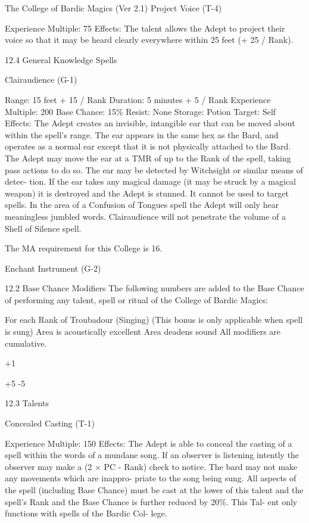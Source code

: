 \begin{Chapter}{The College of Bardic Magics (Ver 2.1)}
Project Voice (T-4) 

Experience Multiple: 75 
Effects: The talent allows the Adept to project their 
voice  so  that  it  may  be  heard  clearly  everywhere 
within 25 feet (+ 25 / Rank). 

12.4 General Knowledge Spells 

Clairaudience (G-1) 

Range: 15 feet + 15 / Rank 
Duration: 5 minutes + 5 / Rank 
Experience Multiple: 200 
Base Chance: 15\% 
Resist: None  
Storage: Potion 
Target: Self 
Effects:  The  Adept  creates  an  invisible,  intangible 
ear  that  can  be  moved  about  within  the  spell’s 
range. The ear appears in the same hex as the Bard, 
and  operates  as  a  normal  ear  except  that  it  is  not 
physically  attached  to  the  Bard.  The  Adept  may 
move  the  ear  at  a  TMR  of  up  to  the  Rank  of  the 
spell, taking pass actions to do so. The ear may be 
detected  by  Witchsight  or  similar  means  of  detec-
tion.  If  the  ear  takes  any  magical  damage  (it  may 
be struck by a magical weapon) it is destroyed and 
the  Adept  is  stunned.  It  cannot  be  used  to  target 
spells. In the area of a Confusion of Tongues spell 
the  Adept  will  only  hear  meaningless  jumbled 
words. Clairaudience will not penetrate the volume 
of a Shell of Silence spell. 

The MA requirement for this College is 16. 

Enchant Instrument (G-2) 

12.2 Base Chance Modifiers 
The  following  numbers  are  added  to  the  Base 
Chance  of  performing  any  talent,  spell  or  ritual  of 
the College of Bardic Magics: 

For each Rank of Troubadour (Singing) 
(This bonus is only applicable when spell is 
sung) 
Area is acoustically excellent 
Area deadens sound 
All modifiers are cumulative. 

+1 

+5 
-5 

12.3 Talents  

Concealed Casting (T-1)  

Experience Multiple: 150 
Effects: The Adept is able to conceal the casting of 
a  spell  within  the  words  of  a  mundane  song.  If  an 
observer  is  listening  intently  the  observer  may 
make a (2 × PC - Rank) check to notice. The bard 
may  not  make  any  movements  which  are  inappro-
priate  to  the  song  being  sung.  All  aspects  of  the 
spell  (including  Base  Chance)  must  be  cast  at  the 
lower  of  this  talent  and  the  spell’s  Rank  and  the 
Base Chance is further reduced by 20\%. This Tal-
ent  only  functions  with  spells  of  the  Bardic  Col-
lege. 


\end{Chapter}
